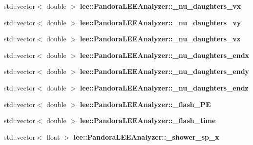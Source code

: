 \begin{DoxyCompactItemize}
\item 
\hypertarget{group__lee_ga35e3d0f602ee460d83440447698baef1}{std\-::vector$<$ double $>$ {\bfseries lee\-::\-Pandora\-L\-E\-E\-Analyzer\-::\-\_\-nu\-\_\-daughters\-\_\-vx}}\label{group__lee_ga35e3d0f602ee460d83440447698baef1}

\item 
\hypertarget{group__lee_gaa564f473e072ce7fc9702781805907bd}{std\-::vector$<$ double $>$ {\bfseries lee\-::\-Pandora\-L\-E\-E\-Analyzer\-::\-\_\-nu\-\_\-daughters\-\_\-vy}}\label{group__lee_gaa564f473e072ce7fc9702781805907bd}

\item 
\hypertarget{group__lee_gadda9ce5e644a8f78ef769f443990ab20}{std\-::vector$<$ double $>$ {\bfseries lee\-::\-Pandora\-L\-E\-E\-Analyzer\-::\-\_\-nu\-\_\-daughters\-\_\-vz}}\label{group__lee_gadda9ce5e644a8f78ef769f443990ab20}

\item 
\hypertarget{group__lee_ga2c05930087430260a4ba4f26beb8355b}{std\-::vector$<$ double $>$ {\bfseries lee\-::\-Pandora\-L\-E\-E\-Analyzer\-::\-\_\-nu\-\_\-daughters\-\_\-endx}}\label{group__lee_ga2c05930087430260a4ba4f26beb8355b}

\item 
\hypertarget{group__lee_gafdefa43fde43f949f6b6af3e908cb1e2}{std\-::vector$<$ double $>$ {\bfseries lee\-::\-Pandora\-L\-E\-E\-Analyzer\-::\-\_\-nu\-\_\-daughters\-\_\-endy}}\label{group__lee_gafdefa43fde43f949f6b6af3e908cb1e2}

\item 
\hypertarget{group__lee_ga0c2eb616df5aa07c601d0bc72399c636}{std\-::vector$<$ double $>$ {\bfseries lee\-::\-Pandora\-L\-E\-E\-Analyzer\-::\-\_\-nu\-\_\-daughters\-\_\-endz}}\label{group__lee_ga0c2eb616df5aa07c601d0bc72399c636}

\item 
\hypertarget{group__lee_ga9320e2f0e9a7e201a978a21a2eb74a39}{std\-::vector$<$ double $>$ {\bfseries lee\-::\-Pandora\-L\-E\-E\-Analyzer\-::\-\_\-flash\-\_\-\-P\-E}}\label{group__lee_ga9320e2f0e9a7e201a978a21a2eb74a39}

\item 
\hypertarget{group__lee_gaecdf711df932ed4823d2c9b222a3e8f4}{std\-::vector$<$ double $>$ {\bfseries lee\-::\-Pandora\-L\-E\-E\-Analyzer\-::\-\_\-flash\-\_\-time}}\label{group__lee_gaecdf711df932ed4823d2c9b222a3e8f4}

\item 
\hypertarget{group__lee_ga9792d3b416a42f2f2a9323318fe3288e}{std\-::vector$<$ float $>$ {\bfseries lee\-::\-Pandora\-L\-E\-E\-Analyzer\-::\-\_\-shower\-\_\-sp\-\_\-x}}\label{group__lee_ga9792d3b416a42f2f2a9323318fe3288e}


\end{DoxyCompactItemize}
